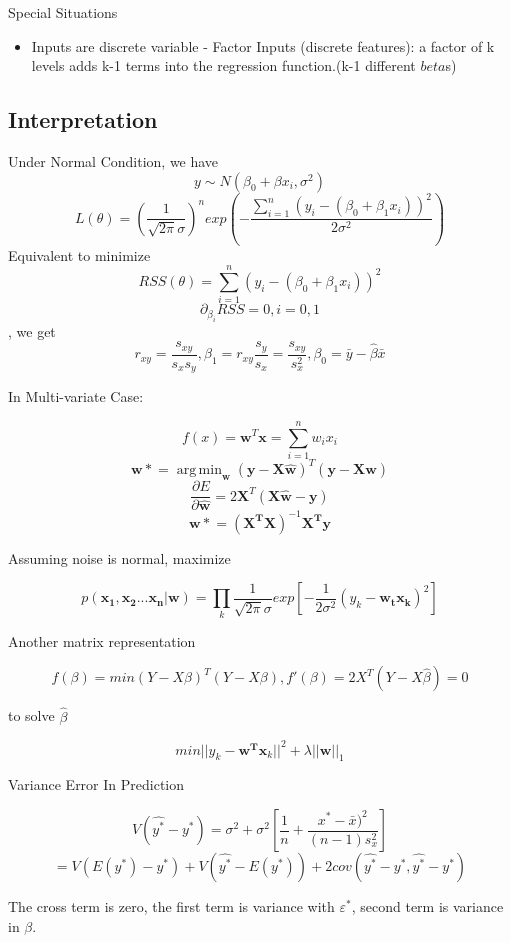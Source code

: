 \documentclass[11pt, openany]{book}              %
\DeclareMathOperator*{\argmin}{arg\,min}  %
\begin{document}
Special Situations

\begin{itemize}
    \item Inputs are discrete variable - Factor Inputs (discrete features): a factor of k levels adds k-1 terms into the regression function.(k-1 different $beta$s)
\end{itemize}


\subsection{Interpretation}


Under Normal Condition, we have
$$y \sim N(\beta_0 + \beta x_i, \sigma^2)$$
$$ L(\theta) = (\frac{1}{\sqrt{2\pi} \sigma})^n exp( - \frac{\sum_{i=1}^n (y_i - (\beta_0 +\beta_1x_i))^2}{2\sigma^2})$$ 
Equivalent to minimize
$$RSS(\theta) = \sum_{i=1}^n (y_i - (\beta_0 +\beta_1x_i))^2$$
$$ \partial_{\beta_i} RSS = 0, i =0,1$$, we get
$$ r_{xy} = \frac{s_{xy}}{s_xs_y}, \beta_1 = r_{xy}\frac{s_y}{s_x} =\frac{s_{xy}}{s_x^2},\beta_0 = \bar{y}-\hat{\beta}\bar{x} $$

In Multi-variate Case:

$$ f(x) = \mathbf{w}^T \mathbf{x} = \sum_{i=1}^n w_i x_i $$
$$\mathbf{w*} = \argmin_{\mathbf{\hat{w}}}(\mathbf{y}-\mathbf{X \hat{w}} )^T(\mathbf{y}-\mathbf{X \hat{w}} )$$
$$\frac{\partial{E}}{\partial{\mathbf{\hat{w}}}} = 2 \mathbf{X}^T(\mathbf{X \hat{w}} - \mathbf{y})$$
$$ \mathbf{w*} = (\mathbf{X^T X})^{-1} \mathbf{X^T y} $$

Assuming noise is normal, maximize 

$$p(\mathbf{x_1, x_2 ... x_n}| \mathbf{ w} ) = \prod_k \frac{1}{\sqrt{2\pi} \sigma} exp[ -\frac{1}{2\sigma^2} (y_k - \mathbf{w_t x_k} )^2 ]$$ 

Another matrix representation

$$f(\beta) = min (Y-X\beta)^T(Y-X\beta), f'(\beta) = 2X^T(Y-X\hat{\beta}) = 0$$ 

to solve $\hat{\beta}$

$$ min ||y_k - \mathbf{w^T x}_k ||^2 + \lambda ||\mathbf{w}||_1 $$




Variance Error In Prediction

$$V(\hat{y^*} - y^*) = \sigma^2 + \sigma^2[\frac{1}{n} + \frac{x^*-\bar{x})^2}{(n-1)s_x^2}]$$
$$ = V(E(y^*) - y^*) + V(\hat{y^*} - E(y^*)) + 2 cov(\hat{y^*} - y^*, \hat{y^*} - y^*)$$

The cross term is zero, the first term is variance with $\varepsilon^*$, second term is variance in $\beta$. 
\end{document}
